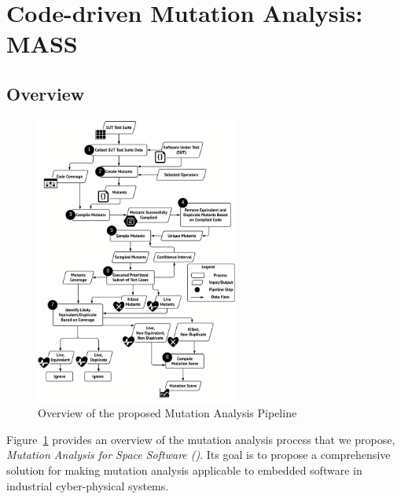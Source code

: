 \section{Code-driven Mutation Analysis: MASS}

\subsection{Overview}
\label{sec:approach}

\begin{figure}[tb]
\begin{center}
\includegraphics[width=0.6\textwidth]{images/Approach}
\caption{Overview of the proposed Mutation Analysis Pipeline}
\label{fig:approach}
\end{center}
\end{figure}

Figure~\ref{fig:approach} provides an overview of the mutation analysis process that we propose, \emph{Mutation Analysis for Space Software (\APPR)}. Its goal is to propose a comprehensive solution for making mutation analysis applicable to embedded software in industrial cyber-physical systems. 
 
